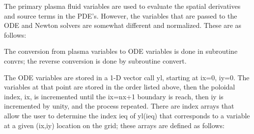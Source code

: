 \documentclass [12pt]{article}
\def\hsa{\hskip.4truein}
\def\hsp6{\hskip.6truein}
\begin{document}
The primary plasma fluid variables are used to evaluate the spatial
derivatives and source terms in the PDE's.  However, the variables that are
passed to the ODE and Newton solvers are somewhat different and normalized.
These are as follows:

{\sf
{}
}

The conversion from plasma variables to ODE variables is done in
subroutine convrs; the reverse conversion is done by subroutine convert.

The ODE variables are stored in a 1-D vector call {\sf yl}, starting at ix=0,
iy=0.  The variables at that point are stored in the order listed above, then
the poloidal index, ix, is incremented until the ix=nx+1 boundary is reach,
then iy is incremented by unity, and the process repeated.  There are index
arrays that allow the user to determine the index ieq of {\sf yl(ieq)} that
corresponds to a variable at a given (ix,iy) location on the grid; these
arrays are defined as follows:

{\sf
{}
}
\end{document}
